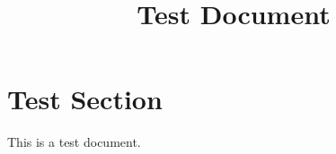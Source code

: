 \documentclass{mymanuscript}
\title{Test Document}
\author{\authorinfo{Test Author}{1}}
\affiliation{1}{Test University}
\begin{document}
\maketitle

\section{Test Section}
This is a test document.
\end{document}
